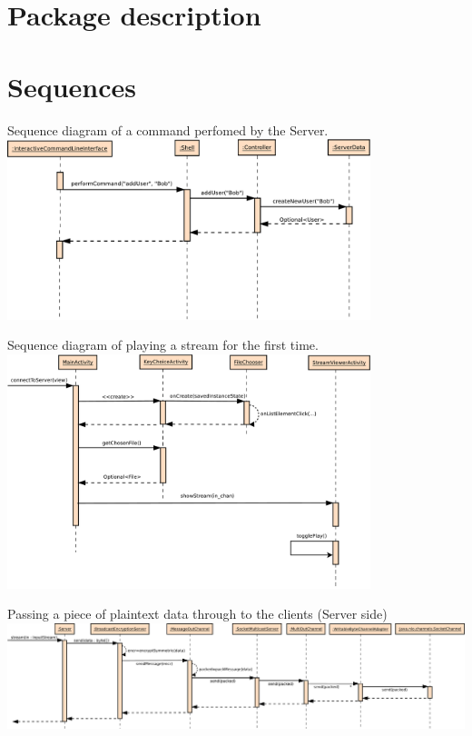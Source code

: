 \documentclass[a4paper,10pt]{scrartcl}
\begin{document}


\section{Package description}









\section{Sequences}
\begin{illustration}{Sequence diagram of a command perfomed by the Server.}
\includegraphics [width=400px] {figures/sequence_diagram_server/Server1.pdf}
\end{illustration}
\begin{illustration}{Sequence diagram of playing a stream for the first time.}
\includegraphics [width=400px] {figures/sequence_diagram_client/sequence_client.pdf}
\end{illustration}

\begin{landscape}
\begin{illustration}{Passing a piece of plaintext data through to the clients (Server side)}
\includegraphics [width=700px] {figures/sequence_diagram_comm1_server/output.pdf}
\end{illustration}
\end{landscape}
\end{document}
